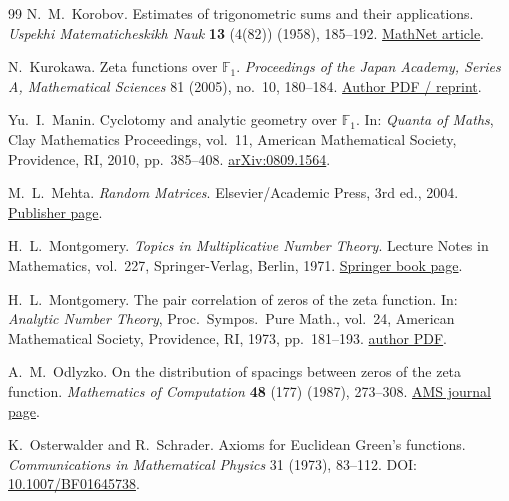 \documentclass{article}
\numberwithin{equation}{section}
\theoremstyle{plain}
\theoremstyle{definition}
\theoremstyle{remark}
\begin{document}
\begin{thebibliography}{99}
N.~M.~Korobov.
\newblock Estimates of trigonometric sums and their applications.
\newblock \emph{Uspekhi Matematicheskikh Nauk} \textbf{13} (4(82)) (1958), 185--192.
\newblock \href{https://www.mathnet.ru/eng/rm7458}{MathNet article}.


N.~Kurokawa.
\newblock Zeta functions over $\mathbb{F}_1$.
\newblock \emph{Proceedings of the Japan Academy, Series A, Mathematical Sciences}
81 (2005), no.~10, 180--184.
\newblock \href{https://cage.ugent.be/~kthas/Fun/library/Kurokawa.pdf}{Author PDF / reprint}.


Yu.~I.~Manin.
\newblock Cyclotomy and analytic geometry over $\mathbb{F}_1$.
\newblock In: \emph{Quanta of Maths}, Clay Mathematics Proceedings, vol.~11,
American Mathematical Society, Providence, RI, 2010, pp.~385--408.
\newblock \href{https://arxiv.org/abs/0809.1564}{arXiv:0809.1564}.


M.~L.~Mehta.
\newblock \emph{Random Matrices}.
\newblock Elsevier/Academic Press, 3rd ed., 2004.
\newblock \href{https://www.elsevier.com/books/random-matrices/mehta/978-0-12-088409-4}{Publisher page}.

H.~L.~Montgomery.
\newblock \emph{Topics in Multiplicative Number Theory}.
\newblock Lecture Notes in Mathematics, vol.~227, Springer-Verlag, Berlin, 1971.
\newblock \href{https://link.springer.com/book/10.1007/BFb0059028}{Springer book page}.


H.~L.~Montgomery.
\newblock The pair correlation of zeros of the zeta function.
\newblock In: \emph{Analytic Number Theory}, Proc.\ Sympos.\ Pure Math., vol.~24,
American Mathematical Society, Providence, RI, 1973, pp.~181--193.
\newblock \href{https://www-personal.umich.edu/~hlm/paircor1.pdf}{author PDF}.


A.~M.~Odlyzko.
\newblock On the distribution of spacings between zeros of the zeta function.
\newblock \emph{Mathematics of Computation} \textbf{48} (177) (1987), 273--308.
\newblock \href{https://www.ams.org/journals/mcom/1987-48-177/S0025-5718-1987-0866115-0/}{AMS journal page}.


K.~Osterwalder and R.~Schrader.
\newblock Axioms for Euclidean Green's functions.
\newblock \emph{Communications in Mathematical Physics} 31 (1973), 83--112.
\newblock DOI:
\href{https://doi.org/10.1007/BF01645738}{10.1007/BF01645738}.


\end{thebibliography}
\end{document}
